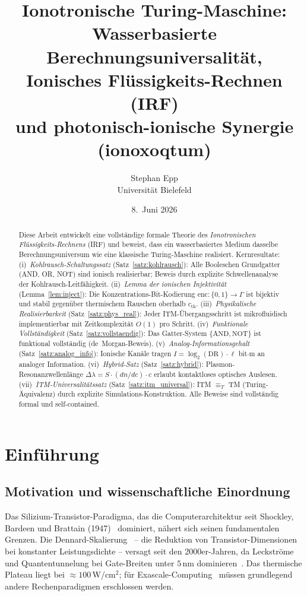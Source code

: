 ﻿\documentclass[a4paper,12pt]{article}
\title{Ionotronische Turing-Maschine:\\[6pt]
Wasserbasierte Berechnungsuniversalit\"at,\\
Ionisches Fl\"ussigkeits-Rechnen (IRF)\\
und photonisch-ionische Synergie (ionoxoqtum)}
\author{Stephan Epp\\[4pt]\small Universit\"at Bielefeld}
\date{8.\ Juni 2026}
\theoremstyle{plain}
\theoremstyle{definition}
\theoremstyle{remark}
\newcommand{\cth}{c_{\mathrm{th}}}
\begin{document}
\maketitle

\begin{abstract}
Diese Arbeit entwickelt eine vollst\"andige formale Theorie des
\emph{Ionotronischen Fl\"ussigkeits-Rechnens} (IRF) und beweist,
dass ein wasserbasiertes Medium dasselbe Berechnungsuniversum wie eine
klassische Turing-Maschine realisiert.
Kernresultate:
(i)~\emph{Kohlrausch-Schaltungssatz} (Satz~\ref{satz:kohlrausch}):
Alle Booleschen Grundgatter (AND, OR, NOT) sind ionisch realisierbar;
Beweis durch explizite Schwellenanalyse der Kohlrausch-Leitf\"ahigkeit.
(ii)~\emph{Lemma der ionischen Injektivit\"at} (Lemma~\ref{lem:inject}):
Die Konzentrations-Bit-Kodierung $\mathrm{enc}: \{0,1\} \to \Gamma$ ist
bijektiv und stabil gegen\"uber thermischem Rauschen oberhalb $\cth$.
(iii)~\emph{Physikalische Realisierbarkeit} (Satz~\ref{satz:phys_real}):
Jeder ITM-\"Ubergangsschritt ist mikrofluidisch implementierbar mit
Zeitkomplexit\"at $O(1)$ pro Schritt.
(iv)~\emph{Funktionale Vollst\"andigkeit} (Satz~\ref{satz:vollstaendig}):
Das Gatter-System $\{\mathrm{AND},\mathrm{NOT}\}$ ist funktional vollst\"andig
(de~Morgan-Beweis).
(v)~\emph{Analog-Informationsgehalt} (Satz~\ref{satz:analog_info}):
Ionische Kan\"ale tragen $I = \log_2(\mathrm{DR})\cdot\ell$ bit$\cdot$m
an analoger Information.
(vi)~\emph{Hybrid-Satz} (Satz~\ref{satz:hybrid}):
Plasmon-Resonanzwellenl\"ange $\Delta\lambda = S\cdot(dn/dc)\cdot c$
erlaubt kontaktloses optisches Auslesen.
(vii)~\emph{ITM-Universalit\"atssatz} (Satz~\ref{satz:itm_universal}):
ITM $\equiv_T$ TM (Turing-\"Aquivalenz) durch explizite Simulations-Konstruktion.
Alle Beweise sind vollst\"andig formal und self-contained.
\end{abstract}

\tableofcontents
\newpage

\section{Einf\"uhrung}

\subsection{Motivation und wissenschaftliche Einordnung}

Das Silizium-Transistor-Paradigma, das die Computerarchitektur seit
Shockley, Bardeen und Brattain (1947)~\cite{shockley1948} dominiert,
n\"ahert sich seinen fundamentalen Grenzen.
Die Dennard-Skalierung~\cite{dennard1974} -- die Reduktion von Transistor-Dimensionen
bei konstanter Leistungsdichte -- versagt seit den 2000er-Jahren,
da Leckstr\"ome und Quantentunnelung bei Gate-Breiten unter $5\,$nm
dominieren~\cite{haensch2006}.
Das thermische Plateau liegt bei $\approx 100\,$W/cm$^2$; f\"ur
Exascale-Computing~\cite{dongarra2011} m\"ussen grundlegend andere
Rechenparadigmen erschlossen werden.
\end{document}
